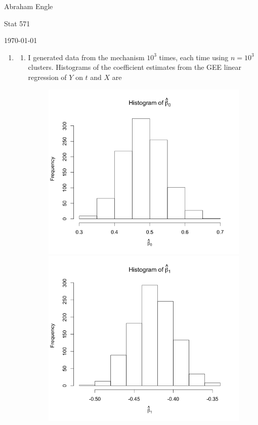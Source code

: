 \documentclass[11pt]{article}
\begin{document}
\pagestyle{empty}
\hfill Abraham Engle

\hfill Stat 571

\hfill \today
\begin{enumerate}
	\item 
		\begin{enumerate}
			\item I generated data from the mechanism $10^3$ times, each time using $n=10^3$ clusters. Histograms of the coefficient estimates from the GEE linear regression of $Y$ on $t$ and $X$ are
			\begin{figure}[H]
				\includegraphics[scale=0.4]{Rplot1a0}
				\includegraphics[scale=0.4]{Rplot1a1}

\end{figure}
\end{enumerate}
\end{enumerate}
\end{document}
